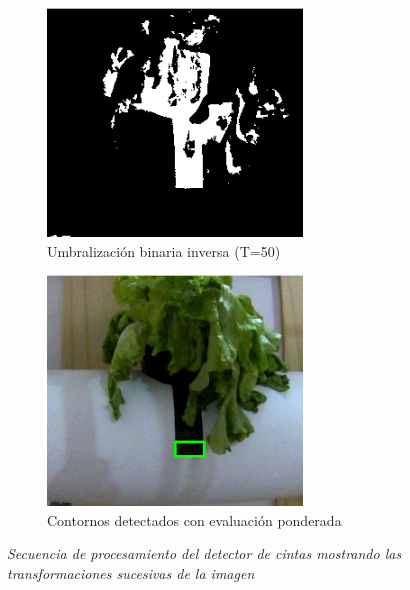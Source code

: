 \begin{figure}[H]
\vspace{0.3cm}

\begin{subfigure}[b]{0.48\textwidth}
    \centering
    \includegraphics[width=\textwidth]{imagenes/detector_marcadores_3_binario.png}
    \caption{Umbralización binaria inversa (T=50)}
\end{subfigure}
\hfill
\begin{subfigure}[b]{0.48\textwidth}
    \centering
    \includegraphics[width=\textwidth]{imagenes/detector_marcadores_4_contornos.png}
    \caption{Contornos detectados con evaluación ponderada}
\end{subfigure}

\caption{\textit{Secuencia de procesamiento del detector de cintas mostrando las transformaciones sucesivas de la imagen}}
\label{fig:proceso_marcadores}
\end{figure}
